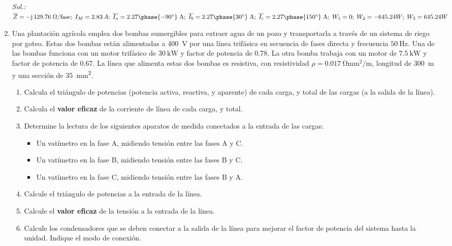 \begin{enumerate}
  \emph{Sol.:
    $\overline{Z}={-\mathrm{j}\,129.76}\;\Omega\text{/fase};\;
    I_M=2.83\,A;\;\overline{I_{a}}={2.27\phase{-90^\circ}\;\text{A}};\;
    \overline{I_{b}}={2.27\phase{30^\circ}\;\text{A}};\;
    \overline{I_{c}}={2.27\phase{150^\circ}\;\text{A}};\; W_1=0;\;
    W_2=-645.24W;\; W_3=645.24W$}

\item Una plantación agrícola emplea dos bombas sumergibles para
  extraer agua de un pozo y transportarla a través de un sistema de
  riego por goteo. Estas dos bombas están alimentadas a
  \SI{400}{\volt} por una línea trifásica en secuencia de fases
  directa y frecuencia $\SI{50}{\hertz}$. Una de las bombas funciona
  con un motor trifásico de $\SI{30}{\kilo\watt}$ y factor de potencia
  de 0.78. La otra bomba trabaja con un motor de
  $\SI{7.5}{\kilo\watt}$ y factor de potencia de 0.67.  La línea que
  alimenta estas dos bombas es resistiva, con resistividad
  $\rho = \SI{0.017}{\ohm\milli\meter\squared\per\meter}$, longitud de
  \SI{300}{m} y una sección de \SI{35}{\milli\meter\squared}.
 
  \begin{enumerate}
  \item Calcula el triángulo de potencias (potencia activa, reactiva,
    y aparente) de cada carga, y total de las cargas (a la salida de
    la línea).
  \item Calcula el \textbf{valor eficaz} de la corriente de línea de
    cada carga, y total.
  \item Determine la lectura de los siguientes aparatos de medida
    conectados a la entrada de las cargas:
    \begin{itemize}
    \item Un vatímetro en la fase A, midiendo tensión entre las fases
      A y C.
    \item Un vatímetro en la fase B, midiendo tensión entre las fases
      B y C.
    \item Un vatímetro en la fase C, midiendo tensión entre las fases
      B y A.
    \end{itemize}
  \item Calcule el triángulo de potencias a la entrada de la línea.
  \item Calcule el \textbf{valor eficaz} de la tensión a la entrada de
    la línea.
  \item Calcule los condensadores que se deben conectar a la salida de
    la línea para mejorar el factor de potencia del sistema hasta la
    unidad. Indique el modo de conexión.
  \end{enumerate}


\end{enumerate}
